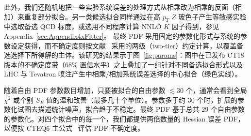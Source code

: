 此外，我们还随机地把一些实验系统误差的处理方式从相乘改为相乘的反面（相加）来重复部分拟合。另一类候选拟合同样通过在高 $p_T$ $Z$ 玻色子产生等敏感实验中选取备选 QCD 标度，或选用不同程序计算 NNLO $K$ 因子得到，参见 Appendix~\ref{sec:Appendix4xFitter}。
最终 PDF 采用固定的参数化形式与系统的参数设定获得，而不确定度则按文献~\cite{Lai:2010vv,Gao:2013xoa} 采用的两级（two-tier）约定计算，以覆盖备选选择下所得解的主体。该研究的结果示于图~\ref{fig:params}：图中在已发布 CT18 版本的不确定度带（68\% 置信水平）之上叠加了一组针对不同备选拟合形式以及 LHC 与 Tevatron 喷注产生中相乘/相加系统误差选择的中心拟合（绿色实线）。

随着自由 PDF 参数数目增加，只要被拟合的自由参数 $\lesssim\! 30$ 个，通常会看到全局 $\chi^2$ 或个别 $S_E$ 值的温和改善（最多几十个单位）。参数多于约 30 个时，扩展的参数化试图去描述统计噪声，拟合趋于不稳定。最终 PDF 基于总共 29 个自由参数的参数化。对四个拟合中的每一个，我们都提供两倍数量的 Hessian 误差 PDF，以便按 CTEQ6 主公式~\cite{Pumplin:2002vw} 评估 PDF 不确定度。
